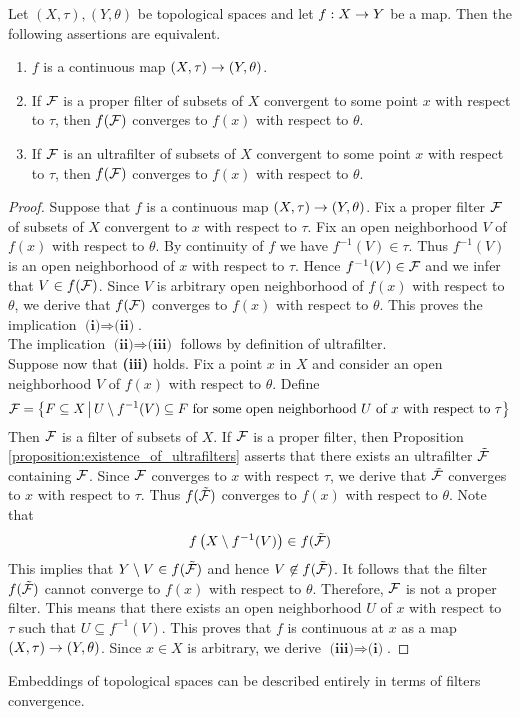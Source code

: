 \begin{proposition}\label{proposition:characterization_of_continuous_maps_in_terms_of_filters}
Let $(X,\tau),(Y,\theta)$ be topological spaces and let $f:X\rightarrow Y$ be a map. Then the following assertions are equivalent.
\begin{enumerate}[label=\emph{\textbf{(\roman*)}}, leftmargin=*]
\item $f$ is a continuous map $\left(X,\tau\right)\rightarrow \left(Y,\theta\right)$.
\item If ${\mathcal F}$ is a proper filter of subsets of $X$ convergent to some point $x$ with respect to $\tau$, then $f({\mathcal F})$ converges to $f(x)$ with respect to $\theta$.
\item If ${\mathcal F}$ is an ultrafilter of subsets of $X$ convergent to some point $x$ with respect to $\tau$, then $f({\mathcal F})$ converges to $f(x)$ with respect to $\theta$.
\end{enumerate}
\end{proposition}
\begin{proof}
Suppose that $f$ is a continuous map $\left(X,\tau\right)\rightarrow \left(Y,\theta\right)$. Fix a proper filter ${\mathcal F}$ of subsets of $X$ convergent to $x$ with respect to $\tau$. Fix an open neighborhood $V$ of $f(x)$ with respect to $\theta$. By continuity of $f$ we have $f^{-1}(V) \in \tau$. Thus $f^{-1}(V)$ is an open neighborhood of $x$ with respect to $\tau$. Hence $f^{-1}(V) \in {\mathcal F}$ and we infer that $V \in f({\mathcal F})$. Since $V$ is arbitrary open neighborhood of $f(x)$ with respect to $\theta$, we derive that $f({\mathcal F})$ converges to $f(x)$ with respect to $\theta$. This proves the implication $\textbf{(i)}\Rightarrow \textbf{(ii)}$.\\
The implication $\textbf{(ii)}\Rightarrow \textbf{(iii)}$ follows by definition of ultrafilter.\\
Suppose now that \textbf{(iii)} holds. Fix a point $x$ in $X$ and consider an open neighborhood $V$ of $f(x)$ with respect to $\theta$. Define
$${\mathcal F} = \big\{F\subseteq X\,\big|\,U\setminus f^{-1}(V)\subseteq F\mbox{ for some open neighborhood }U\mbox{ of }x\mbox{ with respect to }\tau\big\}$$
Then ${\mathcal F}$ is a filter of subsets of $X$. If ${\mathcal F}$ is a proper filter, then Proposition \ref{proposition:existence_of_ultrafilters} asserts that there exists an ultrafilter $\tilde{{\mathcal F}}$ containing ${\mathcal F}$. Since ${\mathcal F}$ converges to $x$ with respect $\tau$, we derive that $\tilde{{\mathcal F}}$ converges to $x$ with respect to $\tau$. Thus $f(\tilde{{\mathcal F}})$ converges to $f(x)$ with respect to $\theta$. Note that
$$f\left(X\setminus f^{-1}(V)\right) \in f(\tilde{{\mathcal F}})$$
This implies that $Y\setminus V \in f(\tilde{{\mathcal F}})$ and hence $V \not \in f(\tilde{{\mathcal F}})$. It follows that the filter $f(\tilde{{\mathcal F}})$ cannot converge to $f(x)$ with respect to $\theta$. Therefore, ${\mathcal F}$ is not a proper filter. This means that there exists an open neighborhood $U$ of $x$ with respect to $\tau$ such that $U \subseteq f^{-1}(V)$. This proves that $f$ is continuous at $x$ as a map $\left(X,\tau\right)\rightarrow \left(Y,\theta\right)$. Since $x\in X$ is arbitrary, we derive $\textbf{(iii)}\Rightarrow \textbf{(i)}$.
\end{proof}
\noindent
Embeddings of topological spaces can be described entirely in terms of filters convergence.

